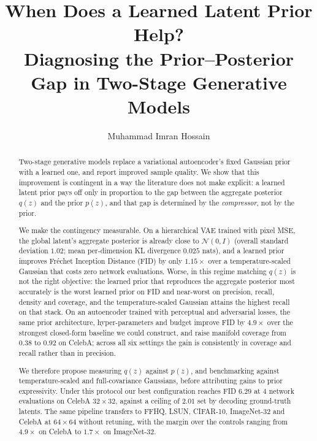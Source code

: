\documentclass[sigconf,nonacm]{acmart}
\begin{document}
\title{When Does a Learned Latent Prior Help?\\
Diagnosing the Prior--Posterior Gap in Two-Stage Generative Models}

\author{Muhammad Imran Hossain}

\begin{abstract}
Two-stage generative models replace a variational autoencoder's fixed Gaussian
prior with a learned one, and report improved sample quality. We show that this
improvement is contingent in a way the literature does not make explicit: a
learned latent prior pays off only in proportion to the gap between the
aggregate posterior $q(z)$ and the prior $p(z)$, and that gap is determined by
the \emph{compressor}, not by the prior.

We make the contingency measurable. On a hierarchical VAE trained with pixel
MSE, the global latent's aggregate posterior is already close to
$\mathcal{N}(0,I)$ (overall standard deviation $1.02$; mean per-dimension KL
divergence $0.025$ nats), and a learned prior improves Fr\'echet Inception
Distance (FID) by only $1.15\times$ over a
temperature-scaled Gaussian that costs zero network evaluations. Worse, in this
regime matching $q(z)$ is not the right objective: the learned prior that reproduces
the aggregate posterior most accurately is the worst learned prior on FID and
near-worst on precision, recall, density and coverage, and the temperature-scaled Gaussian
attains the highest recall on that stack. On an autoencoder trained with
perceptual and adversarial losses, the same prior architecture,
hyper-parameters and budget improve FID by $4.9\times$ over the strongest
closed-form baseline we could construct, and raise manifold coverage from
$0.38$ to $0.92$ on CelebA; across all six settings the gain is
consistently in coverage and recall rather than in precision.

We therefore propose measuring $q(z)$ against $p(z)$, and benchmarking against
temperature-scaled and full-covariance Gaussians, before attributing gains to
prior expressivity. Under this protocol our best configuration reaches FID
$6.29$ at $4$ network evaluations on CelebA $32{\times}32$, against a ceiling
of $2.01$ set by decoding ground-truth latents. The same pipeline transfers to
FFHQ, LSUN, CIFAR-10, ImageNet-32 and CelebA at $64{\times}64$ without
retuning, with the margin over the controls ranging from $4.9\times$ on
CelebA to $1.7\times$ on ImageNet-32.
\end{abstract}
\end{document}
